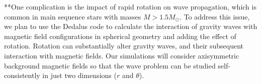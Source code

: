 **One complication is the impact of rapid rotation on wave propagation, which is common in main sequence stars with masses $M > 1.5M_\odot$. To address this issue, we plan to use the Dedalus code to calculate the interaction of gravity waves with  magnetic field configurations in spherical geometry \citep[e.g.][]{Braithwaite_2006} and adding the effect of rotation. Rotation can substantially alter gravity waves, and their subsequent interaction with magnetic fields. Our simulations will consider axisymmetric background magnetic fields so that the wave problem can be studied self-consistently in just two dimensions ($r$ and $\theta$). 